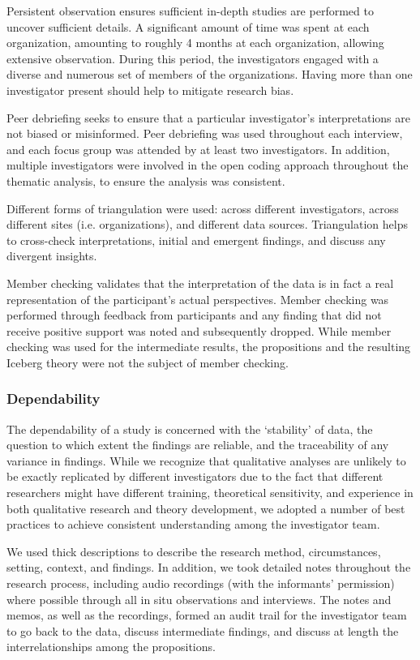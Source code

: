 \documentclass[smallextended]{svjour3}       %
\begin{document}
{Persistent observation} ensures sufficient in-depth studies are performed to uncover sufficient details.
A significant amount of time was spent at each organization, amounting to roughly 4 months at each organization, allowing extensive observation. 
During this period, the investigators engaged with a diverse and numerous set of members of the organizations. 
Having more than one investigator present should help to mitigate research bias.

{Peer debriefing} seeks to ensure that a particular investigator's interpretations are not biased or misinformed.
Peer debriefing was used throughout each interview, and each focus group was attended by at least two investigators.
In addition, multiple investigators were involved in the open coding approach throughout the thematic analysis, to ensure the analysis was consistent.

Different forms of {triangulation} were used: across different investigators, across different sites (i.e. organizations), and different data sources. Triangulation helps to cross-check interpretations, initial and emergent findings, and discuss any divergent insights.


Member checking validates that the interpretation of the data is in fact a real representation of the participant's actual perspectives.
Member checking was performed through feedback from participants and any finding that did not receive positive support was noted and subsequently dropped. While member checking was used for the intermediate results, the propositions and the resulting Iceberg theory were not the subject of member checking. 



\subsubsection{Dependability}

The dependability of a study is concerned with the `stability' of data, the question to which extent the findings are reliable, and the traceability of any variance in findings. While we recognize that qualitative analyses are unlikely to be exactly replicated by different investigators due to the fact that different researchers might have different training, theoretical sensitivity, and experience in both qualitative research and theory development, we adopted a number of best practices to achieve consistent understanding among the investigator team. 

We used thick descriptions to describe the research method, circumstances, setting, context, and findings. 
In addition, we took detailed notes throughout the research process, including audio recordings (with the informants' permission) where possible through all in situ observations and interviews.
The notes and memos, as well as the recordings, formed an audit trail for the investigator team to go back to the data, discuss intermediate findings, and discuss at length the interrelationships among the propositions. 
\end{document}
